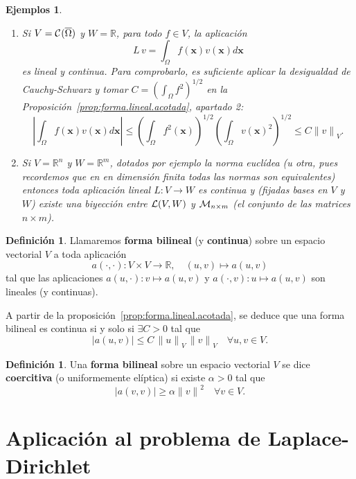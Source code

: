 \documentclass[11pt]{report}
\theoremstyle{plain}
\newtheorem{xexample}[theorem]{Ejemplos}
\newenvironment{examples}%
  {\begin{xexample}~\begin{enumerate}}{\end{enumerate}\end{xexample}}
\theoremstyle{definition}
\newtheorem{definition}[theorem]{Definición}
\newcommand{\R}{\ensuremath{\mathbb{R}}}
\newcommand{\xx}{\ensuremath{\mathbf{x}}\xspace}
\newcommand{\vv}{\ensuremath{v}\xspace}
\newcommand{\abs}[1]{\ensuremath{|#1|}}
\newcommand{\norm}[1]{\ensuremath{\|#1\|}}
\newcommand{\classC}[2]{%
  \ensuremath{
   \ifthenelse{\equal{#2}{}}
    {\mathcal{C}^{#1}}
    {\mathcal{C}^{#1}(#2)}
  }
}
\newcommand{\Cont}[1]{\classC{}{#1}}
\newcommand{\Linear}[2]{\ensuremath{\mathcal}{L}(#1,#2)}
\newcommand{\Matrix}[2]{\ensuremath{\mathcal}{M}_{#1\times#2}}
\begin{document}
\begin{examples}
  \label{ex.forma.lineal.continua}
  \item Si $V=\Cont{\overline\Omega}$ y $W=\R$, para todo $f\in V$, la aplicación 
    \[
      L\,\vv = \int_\Omega f(\xx)\vv(\xx) d\xx
    \]
    es lineal y continua. Para comprobarlo, es suficiente aplicar la desigualdad de Cauchy-Schwarz y tomar $C=\left(\int_\Omega f^2\right)^{1/2}$ en la Proposición~\ref{prop:forma.lineal.acotada}, apartado 2:
    \begin{displaymath}
      \left|\int_\Omega f(\xx)\vv(\xx) d\xx\right| \le \left(\int_\Omega f^2(\xx)\right)^{1/2}\left(\int_\Omega \vv(\xx)^2\right)^{1/2} \le C\norm{\vv}_V.
    \end{displaymath}
  \item Si $V=\R^n$ y $W=\R^m$, dotados por ejemplo la norma euclídea (u otra, pues recordemos que en en dimensión finita todas las normas son equivalentes) entonces toda aplicación lineal $L:V\to W$ es continua y (fijadas bases en $V$ y $W$) existe una biyección entre $\Linear V W$ y $\Matrix n m$ (el conjunto de las matrices $n\times m$).
\end{examples}


\begin{definition}
  Llamaremos \textbf{forma bilineal} (y \textbf{continua}) sobre un espacio vectorial $V$ a toda aplicación 
  $$a(\cdot,\cdot):V \times V\to\R, \quad (u,v)\mapsto a(u,v)$$ 
  tal que las aplicaciones $a(u,\cdot): v\mapsto a(u,v)$ y $a(\cdot,v): u\mapsto a(u,v)$ son lineales (y continuas).
\end{definition}

A partir de la proposición~\ref{prop:forma.lineal.acotada}, se deduce que una forma bilineal es continua si y solo si $\exists C>0$ tal que
\begin{equation}
  \label{eq:forma.bilineal.continua}
  \abs{a(u,v)}\le C\,\norm{u}_V\,\norm{v}_V\quad\forall u,v\in V.
\end{equation}

\begin{definition}
  Una \textbf{forma bilineal} sobre un espacio vectorial $V$ se dice \textbf{coercitiva} (o uniformemente elíptica) si existe $\alpha>0$ tal que
  \begin{equation}
    \abs{a(v,v)}\ge \alpha\norm{v}^2 \quad\forall v\in V.
  \end{equation}
\end{definition}

\section{Aplicación al problema de Laplace-Dirichlet}
\end{document}
